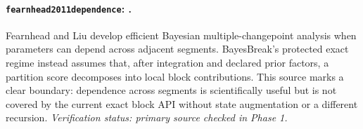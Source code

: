 
\paragraph{\texttt{fearnhead2011dependence}: \citet{fearnhead2011dependence}.}
Fearnhead and Liu develop efficient Bayesian multiple-changepoint analysis when parameters can depend across adjacent segments. BayesBreak's protected exact regime instead assumes that, after integration and declared prior factors, a partition score decomposes into local block contributions. This source marks a clear boundary: dependence across segments is scientifically useful but is not covered by the current exact block API without state augmentation or a different recursion. \textit{Verification status: primary source checked in Phase 1.}
